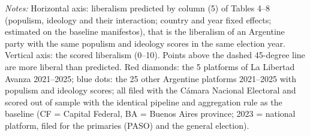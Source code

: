 \par\smallskip\begin{minipage}{\linewidth}\scriptsize\textit{Notes:} Horizontal axis: liberalism predicted by column (5) of Tables 4--8 (populism, ideology and their interaction; country and year fixed effects; estimated on the baseline manifestos), that is the liberalism of an Argentine party with the same populism and ideology scores in the same election year. Vertical axis: the scored liberalism (0--10). Points above the dashed 45-degree line are more liberal than predicted. Red diamonds: the 5 platforms of La Libertad Avanza 2021--2025; blue dots: the 25 other Argentine platforms 2021--2025 with populism and ideology scores; all filed with the C\'amara Nacional Electoral and scored out of sample with the identical pipeline and aggregation rule as the baseline (CF = Capital Federal, BA = Buenos Aires province; 2023 = national platform, filed for the primaries (PASO) and the general election).\end{minipage}

